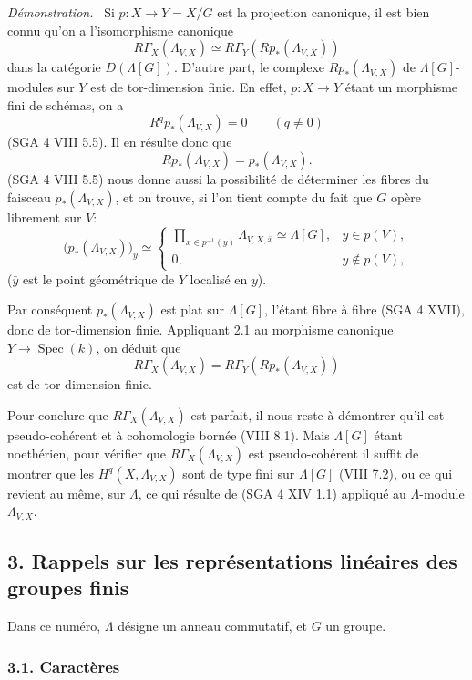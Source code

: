 \documentclass[11pt]{article}
\newenvironment{prooftext}[1][Proof]{\par\noindent\emph{#1.}\ }{\par\medskip}
\DeclareMathOperator{\Spec}{Spec}
\providecommand{\Spec}{\operatorname{Spec}}
\providecommand{\Spec}{\operatorname{Spec}}
\providecommand{\Spec}{\operatorname{Spec}}
\begin{document}
\begin{prooftext}[Démonstration]
Si $p:X\to Y=X/G$ est la projection canonique, il est bien connu qu'on a l'isomorphisme canonique
\[
R\Gamma_X(\Lambda_{V,X})\simeq R\Gamma_Y(Rp_*(\Lambda_{V,X}))
\]
dans la catégorie $D(\Lambda[G])$. D'autre part, le complexe $Rp_*(\Lambda_{V,X})$ de $\Lambda[G]$-modules sur $Y$ est de tor-dimension finie. En effet, $p:X\to Y$ étant un morphisme fini de schémas, on a
\[
R^q p_*(\Lambda_{V,X})=0\qquad(q\ne0)
\]
(SGA 4 VIII 5.5). Il en résulte donc que
\[
Rp_*(\Lambda_{V,X})=p_*(\Lambda_{V,X}).
\]
(SGA 4 VIII 5.5) nous donne aussi la possibilité de déterminer les fibres du faisceau $p_*(\Lambda_{V,X})$, et on trouve, si l'on tient compte du fait que $G$ opère librement sur $V$:
\[
\bigl(p_*(\Lambda_{V,X})\bigr)_{\bar y}\simeq
\begin{cases}
\displaystyle \prod_{x\in p^{-1}(y)}\Lambda_{V,X,\bar x}\simeq \Lambda[G],& y\in p(V),\\[1em]
0,& y\notin p(V),
\end{cases}
\]
($\bar y$ est le point géométrique de $Y$ localisé en $y$).

Par conséquent $p_*(\Lambda_{V,X})$ est plat sur $\Lambda[G]$, l'étant fibre à fibre (SGA 4 XVII), donc de tor-dimension finie. Appliquant 2.1 au morphisme canonique $Y\to\Spec(k)$, on déduit que
\[
R\Gamma_X(\Lambda_{V,X})=R\Gamma_Y(Rp_*(\Lambda_{V,X}))
\]
est de tor-dimension finie.

Pour conclure que $R\Gamma_X(\Lambda_{V,X})$ est parfait, il nous reste à démontrer qu'il est pseudo-cohérent et à cohomologie bornée (VIII 8.1). Mais $\Lambda[G]$ étant noethérien, pour vérifier que $R\Gamma_X(\Lambda_{V,X})$ est pseudo-cohérent il suffit de montrer que les $H^q(X,\Lambda_{V,X})$ sont de type fini sur $\Lambda[G]$ (VIII 7.2), ou ce qui revient au même, sur $\Lambda$, ce qui résulte de (SGA 4 XIV 1.1) appliqué au $\Lambda$-module $\Lambda_{V,X}$.
\end{prooftext}

\subsection*{3. Rappels sur les représentations linéaires des groupes finis}

Dans ce numéro, $\Lambda$ désigne un anneau commutatif, et $G$ un groupe.

\subsubsection*{3.1. Caractères}
\end{document}
